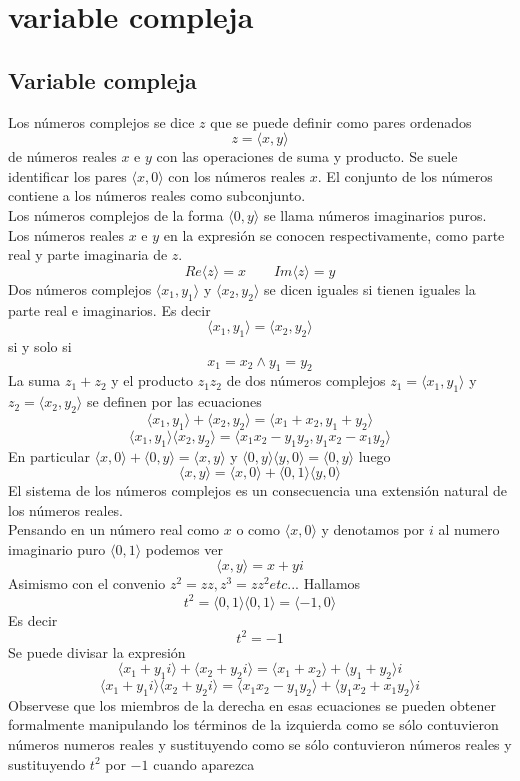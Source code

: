 


\chapter{variable compleja}%
\section{Variable compleja}
\begin{small}
Los números complejos se dice $z$ que se puede definir como pares ordenados $$z=\langle x,y\rangle$$ 
de números reales $x$ e $y$ con las operaciones de suma y producto. Se suele identificar los pares $\langle x,0 \rangle$ con los números reales $x$. El conjunto de los números contiene a los números reales como subconjunto. \\
Los números complejos de la forma $\langle 0,y\rangle$ se llama números imaginarios puros. Los números reales $x$ e $y$ en la expresión se conocen respectivamente, como parte real y parte imaginaria de $z$. $$Re\langle z\rangle=x \qquad Im\langle z\rangle=y$$ 
Dos números complejos $\langle x_{1},y_{1} \rangle $ y $\langle x_{2},y_{2} \rangle $ se dicen iguales si tienen iguales la parte real e imaginarios. Es decir $$\langle x_{1},y_{1} \rangle = \langle x_{2},y_{2} \rangle $$ si y solo si $$ x_{1}=x_{2} \wedge y_{1}=y_{2} $$ La suma $ z_{1} + z_{2} $ y el producto $ z_{1} z_{2}$ de dos números complejos $ z_{1}= \langle x_{1},y_{1} \rangle $ y $ z_{2}= \langle x_{2},y_{2} \rangle $ se definen por las ecuaciones $$\langle x_{1},y_{1} \rangle + \langle x_{2},y_{2} \rangle = \langle x_{1} + x_{2}, y_{1} + y_{2} \rangle $$
$$ \langle x_{1},y_{1} \rangle \langle x_{2},y_{2} \rangle = \langle x_{1} x_{2} - y_{1} y_{2}, y_{1} x_{2} - x_{1} y_{2} \rangle $$
En particular $ \langle x, 0 \rangle + \langle 0, y \rangle = \langle x, y \rangle$ y $ \langle 0, y \rangle \langle y, 0 \rangle = \langle 0, y \rangle $ luego $$ \langle x, y \rangle = \langle x, 0 \rangle + \langle 0, 1 \rangle \langle y, 0 \rangle $$
El sistema de los números complejos es un consecuencia una extensión natural de los números reales.\\
Pensando en un número real como $x$ o como $ \langle x,0 \rangle $ y denotamos por $i$ al numero imaginario puro $ \langle 0, 1 \rangle $ podemos ver $$ \langle x, y \rangle = x + y\textit{i} $$
Asimismo con el convenio $ z^{2}= z z, z^{3} = z z^{2} etc...$ Hallamos $$ t^{2} = \langle 0, 1 \rangle \langle 0, 1 \rangle = \langle -1, 0 \rangle $$
Es decir $$ t^{2} = -1 $$ 
Se puede divisar la expresión $$ \langle x_{1} + y_{1}\textit{i} \rangle + \langle x_{2} + y_{2}\textit{i} \rangle = \langle x_{1} + x_{2} \rangle + \langle y_{1} + y_{2}\rangle \textit{i}$$ $$ \langle x_{1} + y_{1}\textit{i} \rangle \langle x_{2} + y_{2}\textit{i} \rangle = \langle x_{1} x_{2} - y_{1} y_{2} \rangle + \langle y_{1} x_{2} + x_{1} y_{2} \rangle \textit{i} $$
Observese que los miembros de la derecha en esas ecuaciones se pueden obtener formalmente manipulando los términos de la izquierda como se sólo contuvieron números numeros reales y sustituyendo como se sólo contuvieron números reales y sustituyendo $t^{2} $ por $-1$ cuando aparezca

\end{small}

